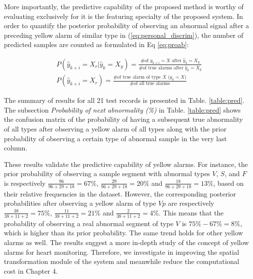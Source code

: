 
More importantly, the predictive capability of the proposed method is worthy of evaluating exclusively for it is the featuring specialty of the proposed system. In order to quantify the posterior probability of observing an abnormal signal after a preceding yellow alarm of similar type in (\ref{eq:personal_discrim}), the number of predicted samples are counted as formulated in Eq \ref{eq:proab}:

\begin{align}
\nonumber 
&P(\hat{y}_{k+i}=X_r|\hat{y}_{k}=X_y)=\frac{\text{\# of $y_{k+i}=X$ after $\hat{y}_k=X_y$}}{\text{\# of true alarms after $\hat{y}_k=X_y$}} \\
&P(\hat{y}_{k+i}=X_r)=\frac{\text{\# of true alarm of type $X$ ($y_{k}=X$)}}{\text{\# of all true alarms}} 
\label{eq:proab}
\end{align}

The summary of results for all 21 test records is presented in Table. \ref{table:pred}. The subsection \textit{Probability of next abnormality (\%)} in Table. \ref{table:pred} shows the confusion matrix of the probability of having a subsequent true abnormality of all types after observing a yellow alarm of all types along with the prior probability of observing a certain type of abnormal sample in the very last column. %

These results validate the predictive capability of yellow alarms. 
For instance, the prior probability of observing a sample segment with abnormal types $V$, $S$, and $F$ is respectively $\frac{96}{96+29+18}=67\%$, $\frac{29}{96+29+18}=20\%$ and $\frac{18}{96+29+18}=13\%$, based on their relative frequencies in the dataset. However, the corresponding posterior probabilities after observing a yellow alarm of type $Vp$ are respectively $\frac{38}{38+11+2}=75\%$, $\frac{11}{38+11+2}=21\%$ and $\frac{2}{38+11+2}=4\%$. This means that the probability of observing a real abnormal segment of type $V$ is $75\%-67\%=8\%$, which is higher than its prior probability. The same trend holds for other yellow alarms as well. The results suggest a more in-depth study of the concept of yellow alarms for heart monitoring. Therefore, we investigate in improving the spatial transformation module of the system and meanwhile reduce the computational cost in Chapter 4.

